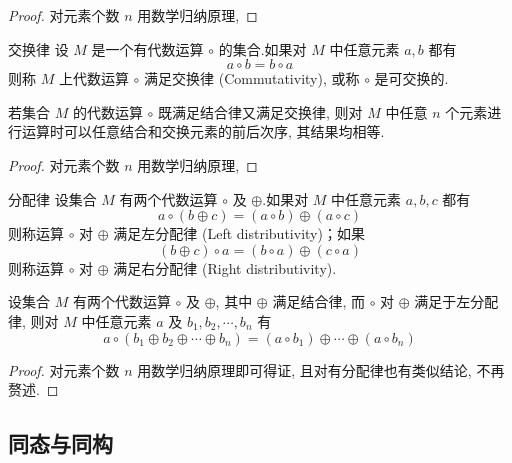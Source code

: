 \documentclass[cn,toc=twocol]{elegantbook}
\begin{document}
\begin{proof}
	对元素个数 $n$ 用数学归纳原理, %
\end{proof}

\begin{definition}{交换律}{}
设 $M$ 是一个有代数运算 $\circ$ 的集合.如果对 $M$ 中任意元素 $a, b$ 都有
\[
	a\circ b = b \circ a
\]
则称 $M$ 上代数运算 $\circ$ 满足交换律 (Commutativity), 或称 $\circ$ 是可交换的.
\end{definition}

\begin{theorem}
	若集合 $M$ 的代数运算 $\circ$ 既满足结合律又满足交换律, 则对 $M$ 中任意 $n$ 个元素进行运算时可以任意结合和交换元素的前后次序, 其结果均相等.
\end{theorem}

\begin{proof}
	对元素个数 $n$ 用数学归纳原理, %
\end{proof}

\begin{definition}{分配律}{}
设集合 $M$ 有两个代数运算 $\circ$ 及 $\oplus$.如果对 $M$ 中任意元素 $a, b, c$ 都有
\[
	a \circ (b \oplus c) = (a \circ b) \oplus (a \circ c)
\]
则称运算 $\circ$ 对 $\oplus$ 满足左分配律 (Left distributivity)；如果
\[
	(b \oplus c) \circ a = (b \circ a) \oplus (c \circ a)
\]
则称运算 $\circ$ 对 $\oplus$ 满足右分配律 (Right distributivity).
\end{definition}

\begin{theorem}
	设集合 $M$ 有两个代数运算 $\circ$ 及 $\oplus$, 其中 $\oplus$ 满足结合律, 而 $\circ$ 对 $\oplus$ 满足于左分配律, 则对 $M$ 中任意元素 $a$ 及 $b_1, b_2, \cdots , b_n$ 有
	\[
		a \circ (b_1 \oplus b_2 \oplus \cdots \oplus b_n) = (a \circ b_1) \oplus \cdots \oplus (a \circ b_n)
	\]
\end{theorem}

\begin{proof}
	对元素个数 $n$ 用数学归纳原理即可得证, 且对有分配律也有类似结论, 不再赘述.
\end{proof}

\subsection{同态与同构}
\end{document}
